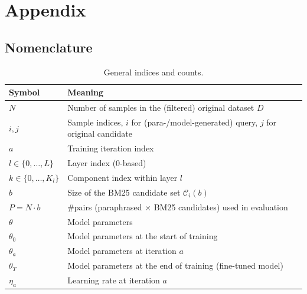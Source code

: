 \chapter{Appendix}
\section{Nomenclature}

\begin{table}[H]
    \centering
    \small
    \begin{tabular}{ll}
        \textbf{Symbol} & \textbf{Meaning} \\
        \hline
        $N$ & Number of samples in the (filtered) original dataset $D$ \\
        $i, j$ & Sample indices, $i$ for (para-/model-generated) query, $j$ for original candidate \\
        $a$ & Training iteration index \\
        $l \in \{0,\dots,L\}$ & Layer index (0-based) \\
        $k \in \{0,\dots,K_l\}$ & Component index within layer $l$ \\
        $b$ & Size of the BM25 candidate set $\mathcal{C}_i(b)$ \\
        $P=N\cdot b$ & \#pairs (paraphrased $\times$ BM25 candidates) used in evaluation \\
        \hline
        $\theta$ & Model parameters \\
        $\theta_0$ & Model parameters at the start of training \\
        $\theta_a$ & Model parameters at iteration $a$ \\
        $\theta_T$ & Model parameters at the end of training (fine-tuned model) \\
        $\eta_a$ & Learning rate at iteration $a$ \\
    \end{tabular}
    \caption{General indices and counts.}
    \label{tab:nomenclature-general}
\end{table}

